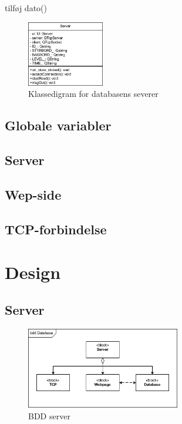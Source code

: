 tilføj dato()
\begin{figure}[htbp]
	\centering
	\includegraphics[width=0.3\textwidth]{billeder/serverKlassediagram}
	\caption{Klassedigram for databasens severer}
	\label{fig:serverKlassediagram}
\end{figure}

\subsection{Globale variabler}


\subsection{Server}



\subsection{Wep-side}

\subsection{TCP-forbindelse}

\section{Design}
\subsection{Server}
\begin{figure}[htbp]
	\centering
	\includegraphics[width=0.6\textwidth]{billeder/bdd_server}
	\caption{BDD server}
	\label{fig:bdd_server}
\end{figure}

